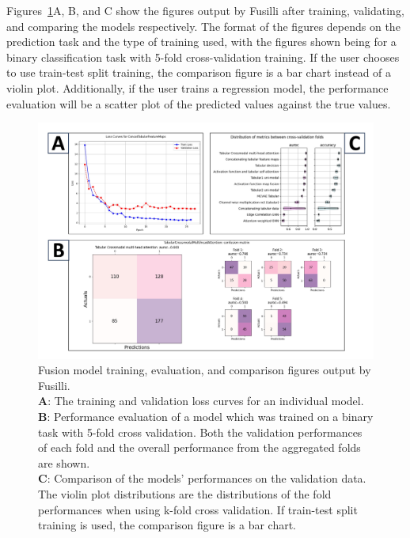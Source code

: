 Figures~\ref{fig:fusillioutputs}A, B, and C show the figures output by Fusilli after training, validating, and comparing the models respectively.
The format of the figures depends on the prediction task and the type of training used, with the figures shown being for a binary classification task with 5-fold cross-validation training.
If the user chooses to use train-test split training, the comparison figure is a bar chart instead of a violin plot.
Additionally, if the user trains a regression model, the performance evaluation will be a scatter plot of the predicted values against the true values.


\begin{figure}
    \centering
    \includegraphics[width=1\linewidth]{figures/fusilli_outputs}
    \caption[Fusion model training, evaluation, and comparison figures output by Fusilli.]{Fusion model training, evaluation, and comparison figures output by Fusilli. \\
    \textbf{A}: The training and validation loss curves for an individual model.\\
    \textbf{B}: Performance evaluation of a model which was trained on a binary task with 5-fold cross validation. Both the validation performances of each fold and the overall performance from the aggregated folds are shown. \\
    \textbf{C}: Comparison of the models' performances on the validation data. The violin plot distributions are the distributions of the fold performances when using k-fold cross validation. If train-test split training is used, the comparison figure is a bar chart.
    }
    \label{fig:fusillioutputs}
\end{figure}



